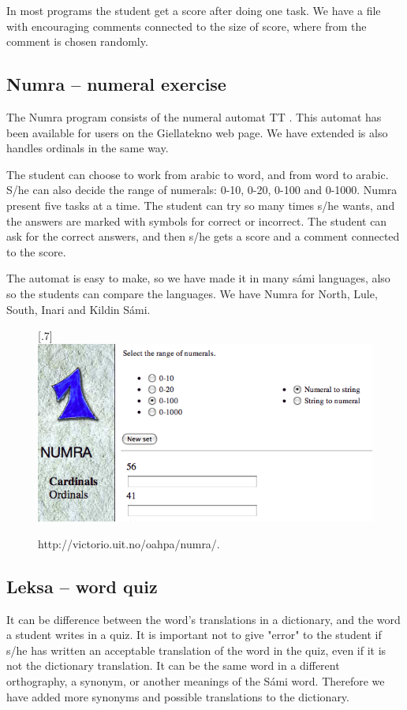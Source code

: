 \documentclass[a4paper,12pt]{article}
\begin{document}
In most programs the student get a score after doing one task. We have a file with encouraging comments connected to the size of score, where from the comment is chosen randomly.

\subsection{Numra -- numeral exercise}
The Numra program consists of the numeral automat TT . This automat has been available for users on the Giellatekno web page. We have extended is also handles ordinals in the same way.  

The student can choose to work from arabic to word, and from word to arabic. S/he can also decide the range of numerals: 0-10, 0-20, 0-100 and 0-1000. Numra present five tasks at a time. The student can try so many times s/he wants, and the answers are marked with symbols for correct or incorrect. The student can ask for the correct answers, and then s/he gets a score and a comment connected to the score.

The automat is easy to make, so we have made it in many sámi languages, also so the students can compare the languages. We have Numra for North, Lule, South, Inari and Kildin Sámi.\\ 


\begin{figure}[htbp]
\begin{center}
\scalebox{.7}[.7]{\includegraphics{img/numra.png}}\\
\caption{http://victorio.uit.no/oahpa/numra/.}
\label{numra}
\end{center}
\end{figure}

\subsection{Leksa -- word quiz}
It can be difference between the word's translations in a dictionary, and the word a student writes in a quiz. It is important not to give "error" to the student if s/he has written an acceptable translation of the word in the quiz, even if it is not the dictionary translation. It can be the same word in a different orthography, a synonym, or another meanings of the Sámi word. Therefore we have added more synonyms and possible translations to the dictionary.
\end{document}
